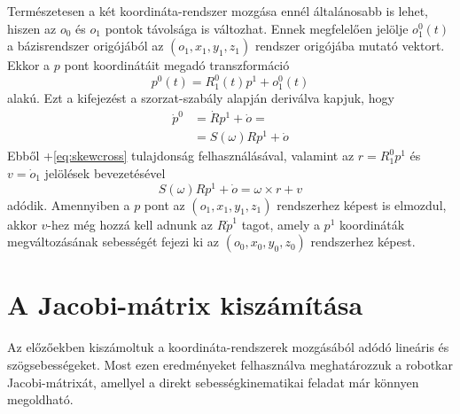 \documentclass[12pt,a4paper]{report}
\theoremstyle{remark}
\theoremstyle{definition}
\begin{document}
Természetesen a két koordináta-rendszer mozgása ennél általánosabb is lehet, hiszen az $o_0$ és $o_1$ pontok 
távolsága is változhat. Ennek megfelelően jelölje $o^{0}_{1}(t)$ a bázisrendszer origójából az 
$(o_1, x_1, y_1, z_1)$ rendszer origójába mutató vektort. Ekkor a $p$ pont koordinátáit megadó transzformáció
\begin{equation}
p^0(t) = R^{0}_{1}(t)p^1 + o^{0}_{1}(t)
\end{equation}
alakú. Ezt a kifejezést a szorzat-szabály alapján deriválva kapjuk, hogy
\begin{equation}
\begin{aligned}
\dot{p}^0 &= \dot{R}p^1 + \dot{o} = \\
    &= S(\omega)Rp^1 + \dot{o}
\end{aligned}
\end{equation}
Ebből \az+\eqref{eq:skewcross} tulajdonság felhasználásával, valamint az $r = R^{0}_{1}p^1$ és $v = \dot{o}_1$ 
jelölések bevezetésével
\begin{equation}
S(\omega)Rp^1 + \dot{o} = \omega \times r + v
\end{equation}
adódik. Amennyiben a $p$ pont az $(o_1, x_1, y_1, z_1)$ rendszerhez képest is elmozdul, akkor $v$-hez még 
hozzá kell adnunk az $R\dot{p}^1$ tagot, amely a $p^1$ koordináták megváltozásának sebességét fejezi ki az
$(o_0, x_0, y_0, z_0)$ rendszerhez képest.

\section{A Jacobi-mátrix kiszámítása}
Az előzőekben kiszámoltuk a koordináta-rendszerek mozgásából adódó lineáris és szögsebességeket. Most ezen 
eredményeket felhasználva meghatározzuk a robotkar Jacobi-mátrixát, amellyel a direkt sebességkinematikai feladat 
már könnyen megoldható.
\end{document}
